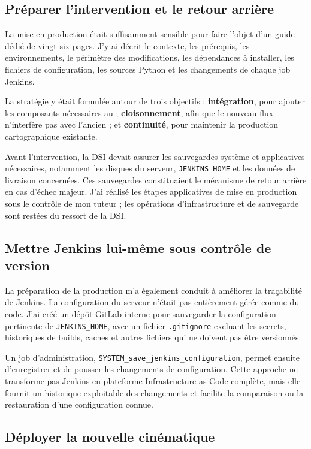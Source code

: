 \subsection{Préparer l'intervention et le retour arrière}

La mise en production était suffisamment sensible pour faire l'objet d'un guide dédié de vingt-six pages. J'y ai décrit le contexte, les prérequis, les environnements, le périmètre des modifications, les dépendances à installer, les fichiers de configuration, les sources Python et les changements de chaque job Jenkins.

La stratégie y était formulée autour de trois objectifs : \textbf{intégration}, pour ajouter les composants nécessaires au  ; \textbf{cloisonnement}, afin que le nouveau flux n'interfère pas avec l'ancien ; et \textbf{continuité}, pour maintenir la production cartographique existante.

Avant l'intervention, la DSI devait assurer les sauvegardes système et applicatives nécessaires, notamment les disques du serveur, \texttt{JENKINS\_HOME} et les données de livraison concernées. Ces sauvegardes constituaient le mécanisme de retour arrière en cas d'échec majeur. J'ai réalisé les étapes applicatives de mise en production sous le contrôle de mon tuteur ; les opérations d'infrastructure et de sauvegarde sont restées du ressort de la DSI.

\subsection{Mettre Jenkins lui-même sous contrôle de version}

La préparation de la production m'a également conduit à améliorer la traçabilité de Jenkins. La configuration du serveur n'était pas entièrement gérée comme du code. J'ai créé un dépôt GitLab interne pour sauvegarder la configuration pertinente de \texttt{JENKINS\_HOME}, avec un fichier \texttt{.gitignore} excluant les secrets, historiques de builds, caches et autres fichiers qui ne doivent pas être versionnés.

Un job d'administration, \texttt{SYSTEM\_save\_jenkins\_configuration}, permet ensuite d'enregistrer et de pousser les changements de configuration. Cette approche ne transforme pas Jenkins en plateforme Infrastructure as Code complète, mais elle fournit un historique exploitable des changements et facilite la comparaison ou la restauration d'une configuration connue.

\subsection{Déployer la nouvelle cinématique}

